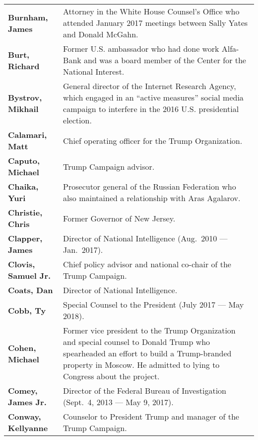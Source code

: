 \begin{longtable}{ p{} p{} }
    \textbf{Burnham, James} & Attorney in the White House Counsel's Office who attended January 2017 meetings between Sally Yates and Donald McGahn. \\

    \textbf{Burt, Richard} & Former U.S. ambassador who had done work Alfa-Bank and was a board member of the Center for the National Interest. \\

    \textbf{Bystrov, Mikhail} & General director of the Internet Research Agency, which engaged in an ``active measures'' social media campaign to interfere in the 2016 U.S. presidential election. \\

    \textbf{Calamari, Matt} & Chief operating officer for the Trump Organization. \\

    \textbf{Caputo, Michael} & Trump Campaign advisor. \\

    \textbf{Chaika, Yuri} & Prosecutor general of the Russian Federation who also maintained a relationship with Aras Agalarov. \\

    \textbf{Christie, Chris} & Former Governor of New Jersey. \\

    \textbf{Clapper, James} & Director of National Intelligence (Aug.~2010 — Jan.~2017). \\

    \textbf{Clovis, Samuel Jr.} & Chief policy advisor and national co-chair of the Trump Campaign. \\

    \textbf{Coats, Dan} & Director of National Intelligence. \\

    \textbf{Cobb, Ty} & Special Counsel to the President (July 2017 — May 2018). \\

    \textbf{Cohen, Michael} & Former vice president to the Trump Organization and special counsel to Donald Trump who spearheaded an effort to build a Trump-branded property in Moscow. He admitted to lying to Congress about the project. \\

    \textbf{Comey, James Jr.} & Director of the Federal Bureau of Investigation (Sept.~4, 2013 — May 9, 2017). \\

    \textbf{Conway, Kellyanne} & Counselor to President Trump and manager of the Trump Campaign. \\


\end{longtable}
